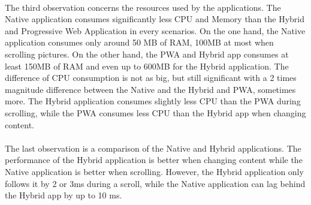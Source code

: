 \documentclass{kththesis}
\begin{document}
\paragraph{}
The third observation concerns the resources used by the applications. The Native application consumes significantly less CPU and Memory than the Hybrid and Progressive Web Application in every scenarios. On the one hand, the Native application consumes only around 50 MB of RAM, 100MB at most when scrolling pictures. On the other hand, the PWA and Hybrid app consumes at least 150MB of RAM and even up to 600MB for the Hybrid application.  \newline
The difference of CPU consumption is not as big, but still significant with a 2 times magnitude difference between the Native and the Hybrid and PWA, sometimes more. The Hybrid application consumes slightly less CPU than the PWA during scrolling, while the PWA consumes less CPU than the Hybrid app when changing content. 


\paragraph{}
The last observation is a comparison of the Native and Hybrid applications. The performance of the Hybrid application is better when changing content while the Native application is better when scrolling. However, the Hybrid application only follows it by 2 or 3ms during a scroll, while the Native application can lag behind the Hybrid app by up to 10 ms. 

\end{document}
